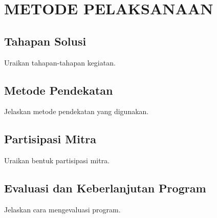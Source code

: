 \clearpage
\section{METODE PELAKSANAAN}

\subsection{Tahapan Solusi}
Uraikan tahapan-tahapan kegiatan.

\subsection{Metode Pendekatan}
Jelaskan metode pendekatan yang digunakan.

\subsection{Partisipasi Mitra}
Uraikan bentuk partisipasi mitra.

\subsection{Evaluasi dan Keberlanjutan Program}
Jelaskan cara mengevaluasi program.
